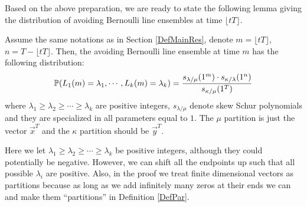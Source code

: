 Based on the above preparation, we are ready to state the following lemma giving the distribution of avoiding Bernoulli line ensembles at time $\lfloor tT \rfloor$.
\begin{lemma}{\label{BerDist}}
Assume the same notations as in Section \ref{DefMainRes}, denote $m=\lfloor tT \rfloor$, $n=T-\lfloor tT \rfloor$. Then, the avoiding Bernoulli line ensemble at time $m$ has the following distribution: 
\begin{align}{\label{ProbMassFunc}}
\mathbb{P}(L_{1}(m) = \lambda_{1}, \cdots, L_{k}(m) = \lambda_{k})=\frac{s_{\lambda/\mu}(1^{m})\cdot s_{\kappa/\lambda}(1^{n})}{s_{\kappa/\mu}(1^{T})}	
\end{align}
where $\lambda_{1}\geq\lambda_{2}\geq\cdots\geq\lambda_{k}$ are positive integers, $s_{\lambda/\mu}$ denote skew Schur polynomials and they are specialized in all parameters equal to $1$. The $\mu$ partition is just the vector $\vec{x}^{T}$ and the $\kappa$ partition should be $\vec{y}^{T}$.
\end{lemma}
\begin{remark}
	Here we let $\lambda_{1}\geq\lambda_{2}\geq\cdots\geq\lambda_{k}$ be positive integers, although they could potentially be negative. However, we can shift all the endpoints up such that all possible $\lambda_{i}$ are positive. Also, in the proof we treat finite dimensional vectors as partitions because as long as we add infinitely many zeros at their ends we can and make them  ``partitions'' in Definition \ref{DefPar}.
\end{remark}
